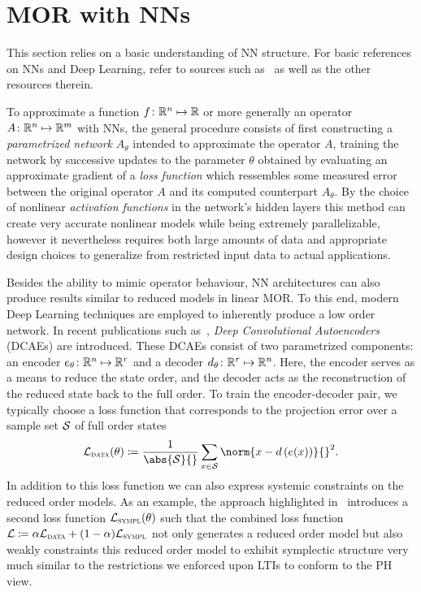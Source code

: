 \section{MOR with \acp{NN}}\label{sec:nn-mor}

This section relies on a basic understanding of \ac{NN} structure.
For basic references on \acp{NN} and Deep Learning, refer to sources such as~\cite{Goodfellow2016, Kubat2017, Sarker2021} as well as the other resources therein.

To approximate a function $f \colon \mathbb{R}^n \mapsto \mathbb{R}$ or more generally an operator $A \colon \mathbb{R}^n \mapsto \mathbb{R}^m$ with \acp{NN}, the general procedure consists of first constructing a \emph{parametrized network} $A_\theta$ intended to approximate the operator $A$, training the network by successive updates to the parameter $\theta$ obtained by evaluating an approximate gradient of a \emph{loss function} which ressembles some measured error between the original operator $A$ and its computed counterpart $A_\theta$.
By the choice of nonlinear \emph{activation functions} in the network's hidden layers this method can create very accurate nonlinear models while being extremely parallelizable, however it nevertheless requires both large amounts of data and appropriate design choices to generalize from restricted input data to actual applications.

Besides the ability to mimic operator behaviour, \ac{NN} architectures can also produce results similar to reduced models in linear MOR.
To this end, modern Deep Learning techniques are employed to inherently produce a low order network.
In recent publications such as~\cite{Lee2020, Salvador2021, Benner2022, Kim2022, Buchfink2023}, \emph{Deep Convolutional Autoencoders} (DCAEs) are introduced.
These DCAEs consist of two parametrized components: an encoder $e_\theta \colon \mathbb{R}^n \mapsto \mathbb{R}^r$ and a decoder $d_\theta \colon \mathbb{R}^r \mapsto \mathbb{R}^n$.
Here, the encoder serves as a means to reduce the state order, and the decoder acts as the reconstruction of the reduced state back to the full order.
To train the encoder-decoder pair, we typically choose a loss function that corresponds to the projection error over a sample set $\mathcal{S}$ of full order states
\begin{equation}\label{eq:reduction-loss}
    \mcl{L}_{\msc{data}}(\theta) \coloneqq \frac{1}{\abs{\mcl{S}}{}} \sum\limits_{x \in \mcl{S}} \norm{x - d\left( e(x) \right)}{}^2.
\end{equation}
In addition to this loss function we can also express systemic constraints on the reduced order models.
As an example, the approach highlighted in~\cite{Buchfink2023} introduces a second loss function $\mathcal{L}_{\textnormal{\scshape sympl}}(\theta)$ such that the combined loss function $\mathcal{L} \coloneqq \alpha \mathcal{L}_{\textnormal{\scshape data}} + (1 - \alpha) \mathcal{L}_{\textnormal{\scshape sympl}}$ not only generates a reduced order model but also weakly constraints this reduced order model to exhibit symplectic structure very much similar to the restrictions we enforced upon \acp{LTI} to conform to the \ac{PH} view.

